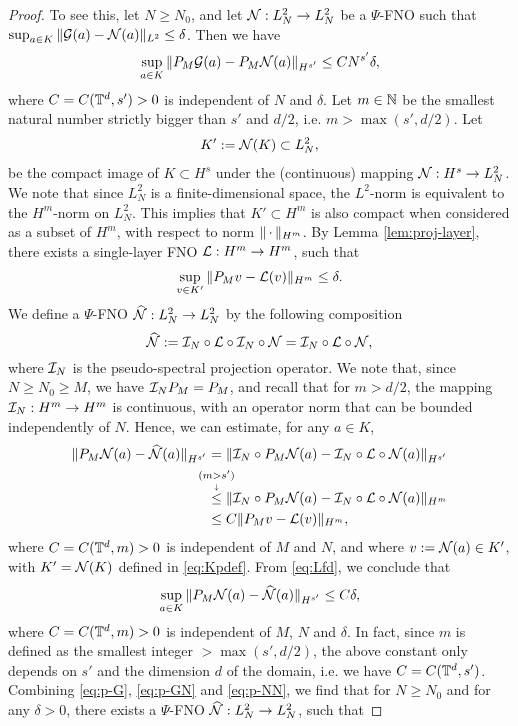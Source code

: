 \documentclass[reqno,a4paper]{amsart}
\begin{document}
\begin{proof}
To see this, let $N\ge N_0$, and let $\mathcal{N}: L^2_N \to L^2_N$ be a $\Psi$-FNO such that 
$\sup_{a\in K} \Vert \mathcal{G}(a) - \mathcal{N}(a) \Vert_{L^2} \le \delta$. Then we have
\begin{align} \label{eq:p-GN}
\sup_{a\in K} \Vert P_M\mathcal{G}(a) - P_M\mathcal{N}(a) \Vert_{H^{s'}}
\le CN^{s'} \delta,
\end{align}
where $C = C(\mathbb{T}^d,s')>0$ is independent of $N$ and $\delta$. Let $m\in \mathbb{N}$ be the smallest natural number strictly bigger than $s'$ and $d/2$, i.e. $m>\max(s', d/2)$. Let 
\begin{align} \label{eq:Kpdef}
K' := \mathcal{N}(K) \subset L^2_N,
\end{align}
 be the compact image of $K\subset H^s$ under the (continuous) mapping $\mathcal{N}: H^s \to L^2_N$. We note that since $L^2_N$ is a finite-dimensional space, the $L^2$-norm is equivalent to the $H^m$-norm on $L^2_N$. This implies that $K'\subset H^m$ is also compact when considered as a subset of $H^m$, with respect to norm $\Vert {\,\cdot\,} \Vert_{H^m}$. By Lemma \ref{lem:proj-layer}, there exists a single-layer FNO $\mathcal{L}: H^m \to H^m$, such that 
\begin{align} \label{eq:Lfd}
\sup_{v\in K'} \Vert P_M v - \mathcal{L}(v) \Vert_{H^{m}}
\le \delta.
\end{align}
We define a $\Psi$-FNO $\widehat{\mathcal{N}}: L^2_N \to L^2_N$ by the following composition
\[
\widehat{\mathcal{N}} := \mathcal{I}_N \circ \mathcal{L} \circ \mathcal{I}_N \circ \mathcal{N}
=
\mathcal{I}_N \circ \mathcal{L} \circ \mathcal{N},
\]
where $\mathcal{I}_N$ is the pseudo-spectral projection operator. We note that, since $N\ge N_0\ge M$, we have $\mathcal{I}_N P_M = P_M$, and recall that for $m>d/2$, the mapping $\mathcal{I}_N: H^m \to H^m$ is continuous, with an operator norm that can be bounded independently of $N$.
Hence, we can estimate, for any $a\in K$,
\begin{align*}
\Vert P_M \cN(a) - \hN(a) \Vert_{H^{s'}}
&=
\Vert \cI_N \circ P_M \cN(a) - \cI_N \circ \cL \circ \cN(a) \Vert_{H^{s'}}
\\
&\explain{\le}{(m>s')}
\Vert \cI_N \circ P_M \cN(a) - \cI_N \circ \cL \circ \cN(a) \Vert_{H^{m}}
\\
&\le
C
\Vert P_M v - \cL(v) \Vert_{H^{m}},
\end{align*}
where $C = C(\mathbb{T}^d,m)>0$ is independent of $M$ and $N$, and where $v:= \mathcal{N}(a) \in K'$, with $K' = \mathcal{N}(K)$ defined in \eqref{eq:Kpdef}. From \eqref{eq:Lfd}, we conclude that 
\begin{align} \label{eq:p-NN}
\sup_{a\in K}
\Vert P_M \mathcal{N}(a) - \widehat{\mathcal{N}}(a) \Vert_{H^{s'}}
\le
C \delta,
\end{align}
where $C = C(\mathbb{T}^d,m)>0$ is independent of $M$, $N$ and $\delta$. In fact, since $m$ is defined as the smallest integer $>\max(s',d/2)$, the above constant only depends on $s'$ and the dimension $d$ of the domain, i.e. we have $C = C(\mathbb{T}^d,s')$. Combining \eqref{eq:p-G}, \eqref{eq:p-GN} and \eqref{eq:p-NN}, we find that for $N \ge N_0$ and for any $\delta >0$, there exists a $\Psi$-FNO $\widehat{\mathcal{N}}: L^2_N \to L^2_N$, such that 

\end{proof}
\end{document}
